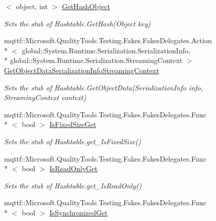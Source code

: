 \begin{DoxyCompactItemize}
$<$ object, int $>$ \hyperlink{class_system_1_1_configuration_1_1_fakes_1_1_stub_settings_context_a00b2e310bf3b2d42503b1e2221589a91}{Get\-Hash\-Object}
\begin{DoxyCompactList}\small\item\em Sets the stub of Hashtable.\-Get\-Hash(\-Object key)\end{DoxyCompactList}\item 
mqttf\-::\-Microsoft.\-Quality\-Tools.\-Testing.\-Fakes.\-Fakes\-Delegates.\-Action\\*
$<$ global\-::\-System.\-Runtime.\-Serialization.\-Serialization\-Info, \\*
global\-::\-System.\-Runtime.\-Serialization.\-Streaming\-Context $>$ \hyperlink{class_system_1_1_configuration_1_1_fakes_1_1_stub_settings_context_a31f852bd5510c6deba8d295b6c4532bf}{Get\-Object\-Data\-Serialization\-Info\-Streaming\-Context}
\begin{DoxyCompactList}\small\item\em Sets the stub of Hashtable.\-Get\-Object\-Data(\-Serialization\-Info info, Streaming\-Context context)\end{DoxyCompactList}\item 
mqttf\-::\-Microsoft.\-Quality\-Tools.\-Testing.\-Fakes.\-Fakes\-Delegates.\-Func\\*
$<$ bool $>$ \hyperlink{class_system_1_1_configuration_1_1_fakes_1_1_stub_settings_context_abd3d931fa1ae8bec903c9a79a6dc5da9}{Is\-Fixed\-Size\-Get}
\begin{DoxyCompactList}\small\item\em Sets the stub of Hashtable.\-get\-\_\-\-Is\-Fixed\-Size()\end{DoxyCompactList}\item 
mqttf\-::\-Microsoft.\-Quality\-Tools.\-Testing.\-Fakes.\-Fakes\-Delegates.\-Func\\*
$<$ bool $>$ \hyperlink{class_system_1_1_configuration_1_1_fakes_1_1_stub_settings_context_ad08b14f2a5856269b428c6ee0331d5f5}{Is\-Read\-Only\-Get}
\begin{DoxyCompactList}\small\item\em Sets the stub of Hashtable.\-get\-\_\-\-Is\-Read\-Only()\end{DoxyCompactList}\item 
mqttf\-::\-Microsoft.\-Quality\-Tools.\-Testing.\-Fakes.\-Fakes\-Delegates.\-Func\\*
$<$ bool $>$ \hyperlink{class_system_1_1_configuration_1_1_fakes_1_1_stub_settings_context_aff4504d5041e2ecac7730b469f13e00e}{Is\-Synchronized\-Get}

\end{DoxyCompactItemize}
